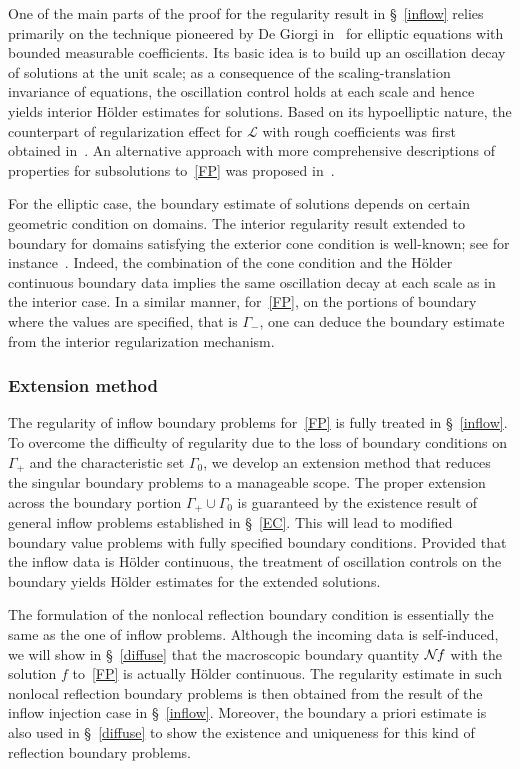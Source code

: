 \documentclass[AHL,Unicode,longabstracts,published]{cedram}
\newcommand*\NN {{\mathcal{N}\hspace{-.3mm}}}
\newcommand{\scL}{\mathscr{L}}
\begin{document}
One of the main parts of the proof for the regularity result in \S~\ref{inflow} relies primarily on the technique pioneered by De Giorgi in~\cite{DG} for elliptic equations with bounded measurable coefficients. Its basic idea is to build up an oscillation decay of solutions at the unit scale; as a consequence of the scaling-translation invariance of equations, the oscillation control holds at each scale and hence yields interior H\"older estimates for solutions. Based on its hypoelliptic nature, the counterpart of regularization effect for $\scL$ with rough coefficients was first obtained in~\cite{Zhang}. An alternative approach with more comprehensive descriptions of properties for subsolutions to~\eqref{FP} was proposed in~\cite{GIMV}.

For the elliptic case, the boundary estimate of solutions depends on certain geometric condition on domains. The interior regularity result extended to boundary for domains satisfying the exterior cone condition is well-known; see for instance~\cite{GT}. Indeed, the combination of the cone condition and the H\"older continuous boundary data implies the same oscillation decay at each scale as in the interior case. In a similar manner, for~\eqref{FP}, on the portions of boundary where the values are specified, that is $\Gamma_-$, one can deduce the boundary estimate from the interior regularization mechanism.

\subsubsection{Extension method} 

The regularity of inflow boundary problems for~\eqref{FP} is fully treated in \S~\ref{inflow}. To overcome the difficulty of regularity due to the loss of boundary conditions on $\Gamma_+$ and the characteristic set $\Gamma_0$, we develop an extension method that reduces the singular boundary problems to a manageable scope. The proper extension across the boundary portion $\Gamma_+\cup\Gamma_0$ is guaranteed by the existence result of general inflow problems established in \S~\ref{EC}. This will lead to modified boundary value problems with fully specified boundary conditions. Provided that the inflow data is H\"older continuous, the treatment of oscillation controls on the boundary yields H\"older estimates for the extended solutions.

The formulation of the nonlocal reflection boundary condition is essentially the same as the one of inflow problems. Although the incoming data is self-induced, we will show in \S~\ref{diffuse} that the macroscopic boundary quantity $\NN f$ with the solution $f$ to~\eqref{FP} is actually H\"older continuous. The regularity estimate in such nonlocal reflection boundary problems is then obtained from the result of the inflow injection case in \S~\ref{inflow}. Moreover, the boundary a priori estimate is also used in \S~\ref{diffuse} to show the existence and uniqueness for this kind of reflection boundary problems.
\end{document}
